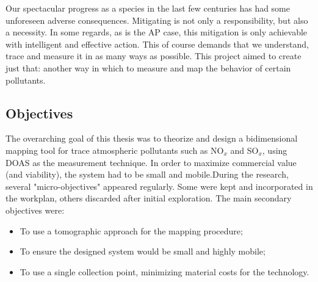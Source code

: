 Our spectacular progress as a species in the last few centuries has had
some unforeseen adverse consequences. Mitigating is not only a
responsibility, but also a necessity. In some regards, as is the
\gls{AP} case, this mitigation is only achievable with intelligent and
effective action. This of course demands that we understand, trace and
measure it in as many ways as possible. This project aimed to create
just that: another way in which to measure and map the behavior of
certain pollutants.




\subsection{Objectives}%
\label{sub:objectives}

The overarching goal of this thesis was to theorize and design a
bidimensional mapping tool for trace atmospheric pollutants such as
NO$_x$ and SO$_x$, using DOAS as the measurement technique. In order to
maximize commercial value (and viability), the system had to be small
and mobile.During the research, several "micro-objectives" appeared
regularly. Some were kept and incorporated in the workplan, others
discarded after initial exploration. The main secondary objectives were:

\begin{itemize}
    \item To use a tomographic approach for the mapping procedure;
    \item To ensure the designed system would be small and highly
        mobile;
    \item To use a single collection point, minimizing material costs
        for the technology.

\end{itemize}


